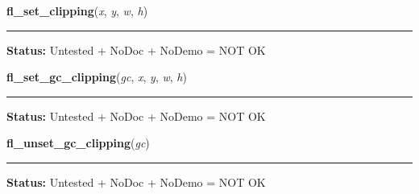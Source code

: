     \vspace{0.5ex}

\hspace{.8\funcindent}\begin{boxedminipage}{\funcwidth}

    \raggedright \textbf{fl\_set\_clipping}(\textit{x}, \textit{y}, \textit{w}, \textit{h})

    \vspace{-1.5ex}

    \rule{\textwidth}{0.5\fboxrule}
\setlength{\parskip}{2ex}
\setlength{\parskip}{1ex}
\textbf{Status:} Untested + NoDoc + NoDemo = NOT OK



    \end{boxedminipage}

    \label{xformslib:library:fl_set_gc_clipping}

    \vspace{0.5ex}

\hspace{.8\funcindent}\begin{boxedminipage}{\funcwidth}

    \raggedright \textbf{fl\_set\_gc\_clipping}(\textit{gc}, \textit{x}, \textit{y}, \textit{w}, \textit{h})

    \vspace{-1.5ex}

    \rule{\textwidth}{0.5\fboxrule}
\setlength{\parskip}{2ex}
\setlength{\parskip}{1ex}
\textbf{Status:} Untested + NoDoc + NoDemo = NOT OK



    \end{boxedminipage}

    \label{xformslib:library:fl_unset_gc_clipping}

    \vspace{0.5ex}

\hspace{.8\funcindent}\begin{boxedminipage}{\funcwidth}

    \raggedright \textbf{fl\_unset\_gc\_clipping}(\textit{gc})

    \vspace{-1.5ex}

    \rule{\textwidth}{0.5\fboxrule}
\setlength{\parskip}{2ex}
\setlength{\parskip}{1ex}
\textbf{Status:} Untested + NoDoc + NoDemo = NOT OK



    \end{boxedminipage}

